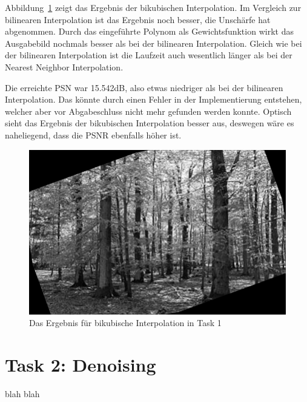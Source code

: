 \smallskip

Abbildung~\ref{fig:t1_bc} zeigt das Ergebnis der bikubischen Interpolation. Im Vergleich zur bilinearen Interpolation ist das Ergebnis noch besser, die Unschärfe hat abgenommen. Durch das eingeführte Polynom als Gewichtsfunktion wirkt das Ausgabebild nochmals besser als bei der bilinearen Interpolation. Gleich wie bei der bilinearen Interpolation ist die Laufzeit auch wesentlich länger als bei der Nearest Neighbor Interpolation.

Die erreichte PSN war 15.542dB, also etwas niedriger als bei der bilinearen Interpolation. Das könnte durch einen Fehler in der Implementierung entstehen, welcher aber vor Abgabeschluss nicht mehr gefunden werden konnte. Optisch sieht das Ergebnis der bikubischen Interpolation besser aus, deswegen wäre es naheliegend, dass die PSNR ebenfalls höher ist.

\begin{figure}[htb]
 \centering
 \includegraphics{./img/t1_bc.png}
 \caption{Das Ergebnis für bikubische Interpolation in Task 1}
 \label{fig:t1_bc}
\end{figure}

\clearpage



\chapter{Task 2: Denoising}

blah blah




%
%

\FloatBarrier\label{end-of-document}


